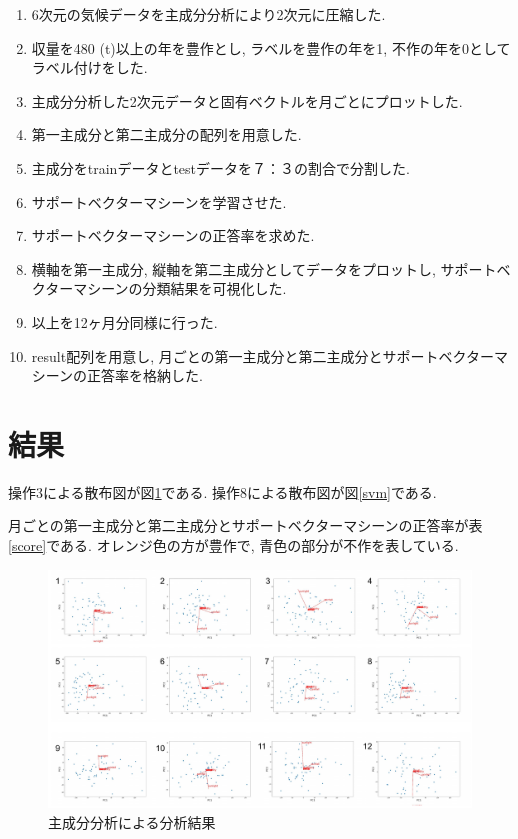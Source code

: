 \documentclass{jarticle}
\begin{document}
\begin{enumerate}
\def\labelenumi{\arabic{enumi}.}
\item
  6次元の気候データを主成分分析により2次元に圧縮した.
\item
  収量を480 (t)以上の年を豊作とし, ラベルを豊作の年を1,
  不作の年を0としてラベル付けをした.
\item
  主成分分析した2次元データと固有ベクトルを月ごとにプロットした.
\item
  第一主成分と第二主成分の配列を用意した.
\item
  主成分をtrainデータとtestデータを７：３の割合で分割した.
\item
  サポートベクターマシーンを学習させた.
\item
  サポートベクターマシーンの正答率を求めた.
\item
  横軸を第一主成分, 縦軸を第二主成分としてデータをプロットし,
  サポートベクターマシーンの分類結果を可視化した.
\item
  以上を12ヶ月分同様に行った.
\item
  result配列を用意し,
  月ごとの第一主成分と第二主成分とサポートベクターマシーンの正答率を格納した.
\end{enumerate}

\hypertarget{header-n2048}{%
\section{結果}\label{header-n2048}}

操作3による散布図が図\ref{pca}である. 操作8による散布図が図\ref{svm}である.

月ごとの第一主成分と第二主成分とサポートベクターマシーンの正答率が表\ref{score}である.
オレンジ色の方が豊作で, 青色の部分が不作を表している.

\begin{figure}[H]
\centering
\includegraphics[keepaspectratio, scale=0.75]
{pca_plot.pdf}
\caption{主成分分析による分析結果}
\label{pca}
\end{figure}
\end{document}
